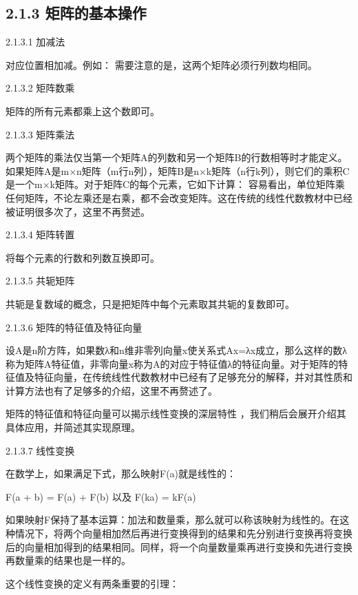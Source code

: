 \subsection{2.1.3 矩阵的基本操作}

2.1.3.1 加减法

对应位置相加减。例如：
需要注意的是，这两个矩阵必须行列数均相同。

2.1.3.2 矩阵数乘

矩阵的所有元素都乘上这个数即可。

2.1.3.3 矩阵乘法

两个矩阵的乘法仅当第一个矩阵A的列数和另一个矩阵B的行数相等时才能定义。如果矩阵A是m×n矩阵（m行n列），矩阵B是n×k矩阵（n行k列），则它们的乘积C是一个m×k矩阵。对于矩阵C的每个元素，它如下计算：
容易看出，单位矩阵乘任何矩阵，不论左乘还是右乘，都不会改变矩阵。这在传统的线性代数教材中已经被证明很多次了，这里不再赘述。

2.1.3.4 矩阵转置

将每个元素的行数和列数互换即可。

2.1.3.5 共轭矩阵

共轭是复数域的概念，只是把矩阵中每个元素取其共轭的复数即可。

2.1.3.6 矩阵的特征值及特征向量

设A是n阶方阵，如果数λ和n维非零列向量x使关系式Ax=λx成立，那么这样的数λ称为矩阵A特征值，非零向量x称为A的对应于特征值λ的特征向量。对于矩阵的特征值及特征向量，在传统线性代数教材中已经有了足够充分的解释，并对其性质和计算方法也有了足够多的介绍，这里不再赘述了。

矩阵的特征值和特征向量可以揭示线性变换的深层特性 ，我们稍后会展开介绍其具体应用，并简述其实现原理。

2.1.3.7 线性变换

在数学上，如果满足下式，那么映射F(a)就是线性的：

F(a + b) = F(a) + F(b) 以及  F(ka) = kF(a)

如果映射F保持了基本运算：加法和数量乘，那么就可以称该映射为线性的。在这种情况下，将两个向量相加然后再进行变换得到的结果和先分别进行变换再将变换后的向量相加得到的结果相同。同样，将一个向量数量乘再进行变换和先进行变换再数量乘的结果也是一样的。

这个线性变换的定义有两条重要的引理：

